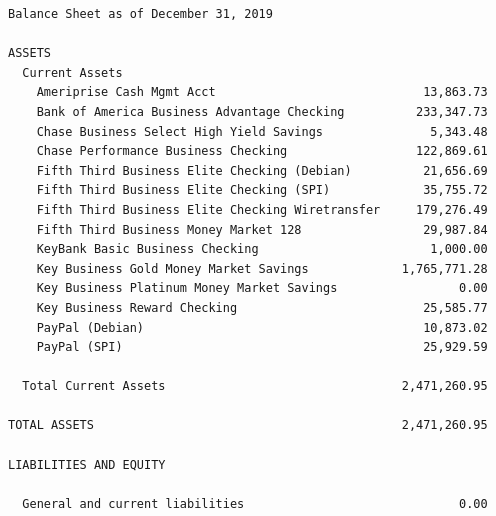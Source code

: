 \documentclass[a4paper]{report}
\begin{document}
\begin{verbatim}
Balance Sheet as of December 31, 2019

ASSETS
  Current Assets
    Ameriprise Cash Mgmt Acct                             13,863.73
    Bank of America Business Advantage Checking          233,347.73
    Chase Business Select High Yield Savings               5,343.48
    Chase Performance Business Checking                  122,869.61
    Fifth Third Business Elite Checking (Debian)          21,656.69
    Fifth Third Business Elite Checking (SPI)             35,755.72
    Fifth Third Business Elite Checking Wiretransfer     179,276.49
    Fifth Third Business Money Market 128                 29,987.84
    KeyBank Basic Business Checking                        1,000.00
    Key Business Gold Money Market Savings             1,765,771.28
    Key Business Platinum Money Market Savings                 0.00
    Key Business Reward Checking                          25,585.77
    PayPal (Debian)                                       10,873.02
    PayPal (SPI)                                          25,929.59

  Total Current Assets                                 2,471,260.95

TOTAL ASSETS                                           2,471,260.95

LIABILITIES AND EQUITY

  General and current liabilities                              0.00


\end{verbatim}
\end{document}
